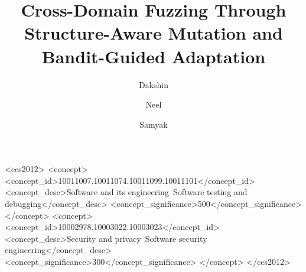 \documentclass[acmsmall,screen,review,nonacm]{acmart}
\begin{document}
\title[Cross-Domain Fuzzing]{Cross-Domain Fuzzing Through Structure-Aware Mutation and Bandit-Guided Adaptation}

\author{Dakshin}
\author{Neel}
\author{Samyak}

\begin{abstract}

\end{abstract}

\begin{CCSXML}
<ccs2012>
  <concept>
    <concept_id>10011007.10011074.10011099.10011101</concept_id>
    <concept_desc>Software and its engineering~Software testing and debugging</concept_desc>
    <concept_significance>500</concept_significance>
  </concept>
  <concept>
    <concept_id>10002978.10003022.10003023</concept_id>
    <concept_desc>Security and privacy~Software security engineering</concept_desc>
    <concept_significance>300</concept_significance>
  </concept>
</ccs2012>
\end{CCSXML}


\maketitle













\end{document}
